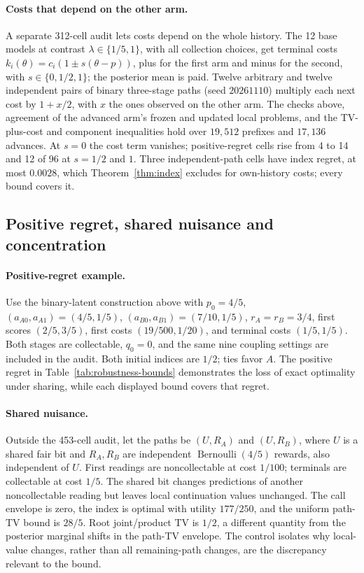 \paragraph{Costs that depend on the other arm.}
A separate 312-cell audit lets costs depend on the whole history. The 12 base models at
contrast $\lambda\in\{1/5,1\}$, with all collection choices, get terminal costs
$k_i(\theta)=c_i(1\pm s(\theta-p))$, plus for the first arm and minus for the second, with
$s\in\{0,1/2,1\}$; the posterior mean is paid. Twelve arbitrary and twelve independent pairs
of binary three-stage paths (seed $20261110$) multiply each next cost by $1+x/2$, with $x$ the
ones observed on the other arm. The checks above, agreement of the advanced arm's frozen and
updated local problems, and the TV-plus-cost and component inequalities hold over $19{,}512$
prefixes and $17{,}136$ advances. At $s=0$ the cost term vanishes; positive-regret cells rise
from 4 to 14 and 12 of 96 at $s=1/2$ and $1$. Three independent-path cells have index regret,
at most $0.0028$, which Theorem~\ref{thm:index} excludes for own-history costs; every bound
covers it.

\subsection{Positive regret, shared nuisance and concentration}
\label{app:sharing-controls}

\paragraph{Positive-regret example.}
Use the binary-latent construction above with $p_0=4/5$,
$(a_{A0},a_{A1})=(4/5,1/5)$, $(a_{B0},a_{B1})=(7/10,1/5)$,
$r_A=r_B=3/4$, first scores $(2/5,3/5)$, first costs $(19/500,1/20)$,
and terminal costs $(1/5,1/5)$. Both stages are collectable, $q_0=0$,
and the same nine coupling settings are included in the audit.
Both initial indices are $1/2$; ties favor $A$.
The positive regret in Table~\ref{tab:robustness-bounds} demonstrates the loss
of exact optimality under sharing, while each displayed bound covers that regret.

\paragraph{Shared nuisance.}
Outside the 453-cell audit, let the paths be $(U,R_A)$ and $(U,R_B)$, where
$U$ is a shared fair bit and $R_A,R_B$ are independent
$\operatorname{Bernoulli}(4/5)$ rewards, also independent of $U$.
First readings are noncollectable at cost $1/100$; terminals are collectable
at cost $1/5$. The shared bit changes predictions of another noncollectable
reading but leaves local continuation values unchanged.
The call envelope is zero, the index is optimal with utility $177/250$, and
the uniform path-TV bound is $28/5$. Root joint/product TV is $1/2$, a different
quantity from the posterior marginal shifts in the path-TV envelope.
The control isolates why local-value changes, rather than all remaining-path
changes, are the discrepancy relevant to the bound.

